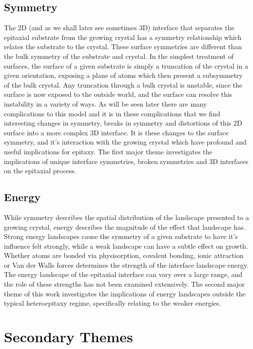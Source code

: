 \subsection{Symmetry}
The 2D (and as we shall later see sometimes 3D) interface that separates the epitaxial substrate from the growing crystal has a symmetry relationship which relates the substrate to the crystal.
These surface symmetries are different than the bulk symmetry of the substrate and crystal.
In the simplest treatment of surfaces, the surface of a given substrate is simply a truncation of the crystal in a given orientation, exposing a plane of atoms which then present a subsymmetry of the bulk crystal. Any truncation through a bulk crystal is unstable, since the surface is now exposed to the outside world, and the surface can resolve this instability in a variety of ways.
As will be seen later there are many complications to this model and it is in these complications that we find interesting changes in symmetry, breaks in symmetry and distortions of this 2D surface into a more complex 3D interface.
It is these changes to the surface symmetry, and it's interaction with the growing crystal which have profound and useful implications for epitaxy.
The first major theme investigates the implications of unique interface symmetries, broken symmetries and 3D interfaces on the epitaxial process.

\subsection{Energy}
While symmetry describes the spatial distribution of the landscape presented to a growing crystal, energy describes the magnitude of the effect that landscape has.
Strong energy landscapes cause the symmetry of a given substrate to have it's influence felt strongly, while a weak landscape can have a subtle effect on growth. Whether atoms are bonded via physisorption, covalent bonding, ionic attraction or Van der Walls forces determines the strength of the interface landscape energy.
The energy landscape of the epitaxial interface can vary over a large range, and the role of these strengths has not been examined extensively.
The second major theme of this work investigates the implications of energy landscapes outside the typical heteroepitaxy regime, specifically relating to the weaker energies.

\section{Secondary Themes}
